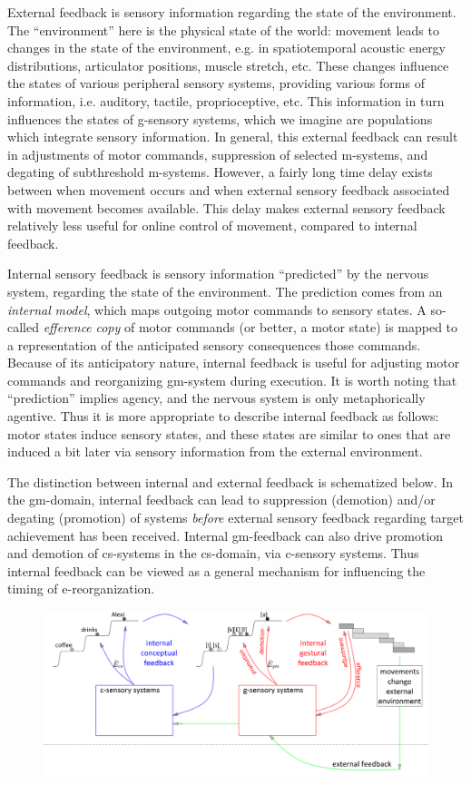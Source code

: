   External feedback is sensory information regarding the state of the environment. The “environment” here is the physical state of the world: movement leads to changes in the state of the environment, e.g. in spatiotemporal acoustic energy distributions, articulator positions, muscle stretch, etc. These changes influence the states of various peripheral sensory systems, providing various forms of information, i.e. auditory, tactile, proprioceptive, etc. This information in turn influences the states of g-sensory systems, which we imagine are populations which integrate sensory information. In general, this external feedback can result in adjustments of motor commands, suppression of selected m-systems, and degating of subthreshold m-systems. However, a fairly long time delay exists between when movement occurs and when external sensory feedback associated with movement becomes available. This delay makes external sensory feedback relatively less useful for online control of movement, compared to internal feedback. 

  Internal sensory feedback is sensory information “predicted” by the nervous system, regarding the state of the environment. The prediction comes from an \textit{internal} \textit{model}, which maps outgoing motor commands to sensory states. A so-called \textit{efference} \textit{copy} of motor commands (or better, a motor state) is mapped to a representation of the anticipated sensory consequences those commands. Because of its anticipatory nature, internal feedback is useful for adjusting motor commands and reorganizing gm-system during execution. It is worth noting that “prediction” implies agency, and the nervous system is only metaphorically agentive. Thus it is more appropriate to describe internal feedback as follows: motor states induce sensory states, and these states are similar to ones that are induced a bit later via sensory information from the external environment.

The distinction between internal and external feedback is schematized below. In the gm-domain, internal feedback can lead to suppression (demotion) and/or degating (promotion) of systems \textit{before} external sensory feedback regarding target achievement has been received. Internal gm-feedback can also drive promotion and demotion of cs-systems in the cs-domain, via c-sensory systems. Thus internal feedback can be viewed as a general mechanism for influencing the timing of e-reorganization.

  
\begin{figure}
\includegraphics[width=\textwidth]{figures/Tilsen-img57.png}
\caption{\missingcaption}
\label{fig:}
\end{figure}
       


